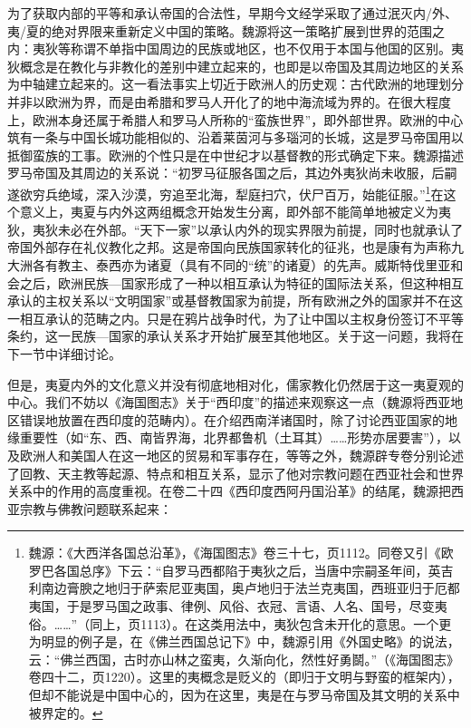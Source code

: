\documentclass[a4paper, 12pt, openright]{ctexbook}
\begin{document}
为了获取内部的平等和承认帝国的合法性，早期今文经学采取了通过泯灭内/外、夷/夏的绝对界限来重新定义中国的策略。魏源将这一策略扩展到世界的范围之内：夷狄等称谓不单指中国周边的民族或地区，也不仅用于本国与他国的区别。夷狄概念是在教化与非教化的差别中建立起来的，也即是以帝国及其周边地区的关系为中轴建立起来的。这一看法事实上切近于欧洲人的历史观：古代欧洲的地理划分并非以欧洲为界，而是由希腊和罗马人开化了的地中海流域为界的。在很大程度上，欧洲本身还属于希腊人和罗马人所称的“蛮族世界”，即外部世界。欧洲的中心筑有一条与中国长城功能相似的、沿着莱茵河与多瑙河的长城，这是罗马帝国用以抵御蛮族的工事。欧洲的个性只是在中世纪才以基督教的形式确定下来。魏源描述罗马帝国及其周边的关系说：“初罗马征服各国之后，其边外夷狄尚未收服，后嗣遂欲穷兵绝域，深入沙漠，穷追至北海，犁庭扫穴，伏尸百万，始能征服。”\footnote{魏源：《大西洋各国总沿革》，《海国图志》卷三十七，页1112。同卷又引《欧罗巴各国总序》下云：“自罗马西都陷于夷狄之后，当唐中宗嗣圣年间，英吉利南边膏腴之地归于萨索尼亚夷国，奥卢地归于法兰克夷国，西班亚归于厄都夷国，于是罗马国之政事、律例、风俗、衣冠、言语、人名、国号，尽变夷俗。……”（同上，页1113）。在这类用法中，夷狄包含未开化的意思。一个更为明显的例子是，在《佛兰西国总记下》中，魏源引用《外国史略》的说法，云：“佛兰西国，古时亦山林之蛮夷，久渐向化，然性好勇鬬。”（《海国图志》卷四十二，页1220）。这里的夷概念是贬义的（即归于文明与野蛮的框架内），但却不能说是中国中心的，因为在这里，夷是在与罗马帝国及其文明的关系中被界定的。}在这个意义上，夷夏与内外这两组概念开始发生分离，即外部不能简单地被定义为夷狄，夷狄未必在外部。“天下一家”以承认内外的现实界限为前提，同时也就承认了帝国外部存在礼仪教化之邦。这是帝国向民族国家转化的征兆，也是康有为声称九大洲各有教主、泰西亦为诸夏（具有不同的“统”的诸夏）的先声。威斯特伐里亚和会之后，欧洲民族—国家形成了一种以相互承认为特征的国际法关系，但这种相互承认的主权关系以“文明国家”或基督教国家为前提，所有欧洲之外的国家并不在这一相互承认的范畴之内。只是在鸦片战争时代，为了让中国以主权身份签订不平等条约，这一民族—国家的承认关系才开始扩展至其他地区。关于这一问题，我将在下一节中详细讨论。

但是，夷夏内外的文化意义并没有彻底地相对化，儒家教化仍然居于这一夷夏观的中心。我们不妨以《海国图志》关于“西印度”的描述来观察这一点（魏源将西亚地区错误地放置在西印度的范畴内）。在介绍西南洋诸国时，除了讨论西亚国家的地缘重要性（如“东、西、南皆界海，北界都鲁机（土耳其）……形势亦居要害”），以及欧洲人和美国人在这一地区的贸易和军事存在，等等之外，魏源辟专卷分别论述了回教、天主教等起源、特点和相互关系，显示了他对宗教问题在西亚社会和世界关系中的作用的高度重视。在卷二十四《西印度西阿丹国沿革》的结尾，魏源把西亚宗教与佛教问题联系起来：
\end{document}
